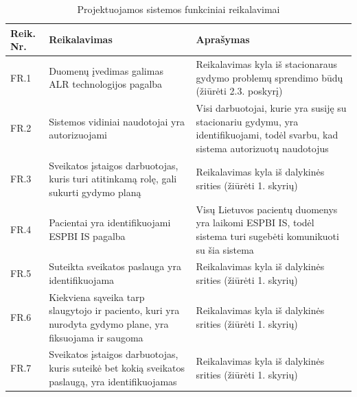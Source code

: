 \begin{table}[!ht]
    \centering
    \renewcommand{\arraystretch}{1.2}
    \renewcommand\thetable{5}
    \caption{Projektuojamos sistemos funkciniai reikalavimai} 

    \begin{tabular}{|m{3em}|m{17em}|m{17em}|}
    \hline 
    \rowcolor[HTML]{EFEFEF} 
    Reik. Nr. & Reikalavimas & Aprašymas \\ \hline
    FR.1  &  Duomenų įvedimas galimas ALR technologijos pagalba  & Reikalavimas kyla iš stacionaraus gydymo problemų sprendimo būdų  (žiūrėti 2.3. poskyrį)    \\ \hline
    FR.2  &  Sistemos vidiniai naudotojai yra autorizuojami  &  Visi darbuotojai, kurie yra susiję su stacionariu gydymu,  yra identifikuojami, todėl svarbu, kad sistema autorizuotų naudotojus       \\ \hline
    FR.3  &  Sveikatos įstaigos darbuotojas, kuris turi atitinkamą rolę, gali sukurti gydymo planą  &   Reikalavimas kyla iš dalykinės srities (žiūrėti 1. skyrių)       \\ \hline
    FR.4  &  Pacientai yra identifikuojami ESPBI IS pagalba  &  Visų Lietuvos pacientų duomenys yra laikomi ESPBI IS, todėl sistema turi sugebėti komunikuoti su šia sistema      \\ \hline
    FR.5  &  Suteikta sveikatos paslauga yra identifikuojama  &   Reikalavimas kyla iš dalykinės srities (žiūrėti 1. skyrių)      \\ \hline
    FR.6  &  Kiekviena sąveika tarp slaugytojo ir paciento, kuri yra nurodyta gydymo plane, yra fiksuojama ir saugoma  &   Reikalavimas kyla iš dalykinės srities (žiūrėti 1. skyrių)       \\ \hline
    FR.7  &  Sveikatos įstaigos darbuotojas, kuris suteikė bet kokią sveikatos paslaugą, yra identifikuojamas  &   Reikalavimas kyla iš dalykinės srities (žiūrėti 1. skyrių)        \\ \hline
    
    \end{tabular}
\end{table}

